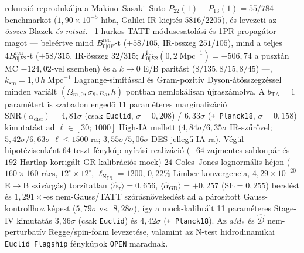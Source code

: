 \documentclass[11pt,a4paper]{article}
\begin{document}
\begin{enumerate}
rekurzió reprodukálja a Makino--Sasaki--Suto \cite{ColesJones1991} $P_{22}(1)+P_{13}(1) = 55/784$ benchmarkot ($1{,}90\times 10^{-5}$ hiba, Galilei IR-kiejtés $5816/2205$), és levezeti az \emph{összes} Blazek \textit{és mtsai.}\ \cite{Blazek2019} 1-hurkos TATT móduscsatolási és 1PR propagátor-magot --- beleértve mind $B_{0|0E}^{\mathrm{ren}}$-t ($+58/105$, IR-összeg $251/105$), mind a teljes $4 B_{0|E2}^{\mathrm{ren}}$-t ($+58/315$, IR-összeg $32/315$; $P_{0|E2}^{\mathrm{tot}}(0{,}2\;\mathrm{Mpc}^{-1}) = -506{,}74$ a pusztán MC $-124{,}02$-vel szemben) és a $k\to 0$ E/B paritást ($8/135, 8/15, 8/45$) ---, $k_{\mathrm{sm}} = 1{,}0\,h\;\mathrm{Mpc}^{-1}$ Lagrange-simítással és Gram-pozitív Dyson-átösszegzéssel minden variált $(\Omega_{m,0},\sigma_8,n_s,h)$ pontban nemlokálisan újraszámolva. A $b_{\mathrm{TA}} = 1$ paramétert is szabadon engedő 11 paraméteres marginalizáció $\mathrm{SNR}(\alpha_{\mathrm{disf}}) = 4{,}81\sigma$ (csak \texttt{Euclid}, $\sigma = 0{,}208$) / $6{,}33\sigma$ (\texttt{+ Planck18}, $\sigma = 0{,}158$) kimutatást ad $\ell\in[30;\,1000]$ High-IA mellett ($4{,}84\sigma / 6{,}35\sigma$ IR-szűrővel; $5{,}42\sigma / 6{,}63\sigma$ $\ell\le 1500$-ra; $3{,}55\sigma / 5{,}06\sigma$ DES-jellegű IA-ra). Végül hipotézisenként $64$ teszt fénykúp-nyírási realizáció (+$64$ zajmentes sablonpár és $192$ Hartlap-korrigált GR kalibrációs mock) $24$ Coles--Jones \cite{ColesJones1991} lognormális héjon ($160\times 160$ rács, $12^\circ\times 12^\circ$, $\ell_{\mathrm{Nyq}}=1200$, $0{,}22\%$ Limber-konvergencia, $4{,}29\times 10^{-20}$ E$\to$B szivárgás) torzítatlan $\langle\hat{\alpha}_\tau\rangle = 0{,}656$, $\langle\hat{\alpha}_{\mathrm{GR}}\rangle = +0{,}257$ ($\mathrm{SE}=0{,}255$) becslést és $1{,}291\times$-es nem-Gauss/TATT szórásnövekedést ad a párosított Gauss-kontrollhoz képest ($5{,}79\sigma$ vs.\ $8{,}28\sigma$), így a mock-kalibrált 11 paraméteres Stage-IV kimutatás $3{,}36\sigma$ (csak \texttt{Euclid}) és $4{,}42\sigma$ (\texttt{+ Planck18}). Az $a M_*$ és $\hat{\mathcal{D}}$ nem-perturbatív Regge/spin-foam levezetése, valamint az N-test hidrodinamikai \texttt{Euclid Flagship} fénykúpok \texttt{OPEN} maradnak.
\end{enumerate}
\end{document}
